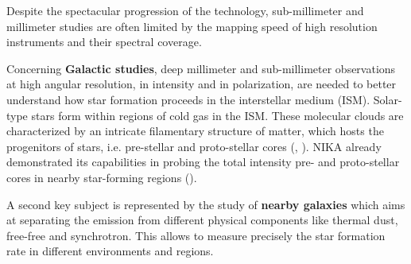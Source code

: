 \documentclass[]{aa} %
\begin{document}


Despite the spectacular progression of the technology, sub-millimeter and millimeter studies are often limited by the mapping speed of high resolution instruments and their spectral coverage. 

Concerning \textbf{Galactic studies}, deep millimeter and sub-millimeter observations at high angular resolution, in intensity and in polarization, are needed to better understand how star formation proceeds in the interstellar medium (ISM). Solar-type stars form within regions of cold gas in the ISM. These molecular clouds are characterized by an intricate filamentary structure of matter, which hosts the progenitors of stars, i.e. pre-stellar and proto-stellar cores (\cite{Andre2010}, \cite{Konyves2015}). NIKA already demonstrated its capabilities in probing the total intensity pre- and proto-stellar cores in nearby star-forming regions (\cite{Bracco2017}). 

A second key subject is represented by the study of \textbf{nearby galaxies} which aims at separating the emission from different physical components like thermal dust, free-free and synchrotron. This allows to measure precisely the star formation rate in different environments and regions. 
\end{document}
